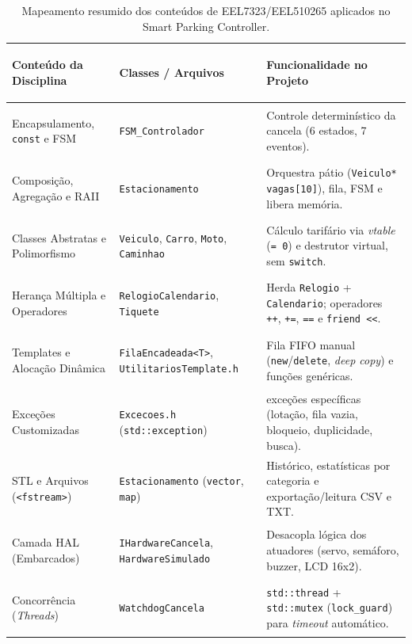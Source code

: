 \documentclass[10pt,twocolumn,a4paper]{article}
\newcommand{\code}[1]{\texttt{\footnotesize #1}}
\begin{document}
\begin{table}[t]
\centering
\caption{Mapeamento resumido dos conteúdos de EEL7323/EEL510265 aplicados no Smart Parking Controller.}
\label{tab:rastreabilidade}
\renewcommand{\arraystretch}{1.28}
\setlength{\tabcolsep}{6pt}
\footnotesize
{}
\begin{tabularx}{\textwidth}{
    >{\bfseries\raggedright\arraybackslash}p{4.1cm}
    >{\raggedright\arraybackslash}p{4.3cm}
    >{\raggedright\arraybackslash}X}
\toprule
\rowcolor{ufscBlue}
\color{white}Conteúdo da Disciplina &
\color{white}\textbf{Classes / Arquivos} &
\color{white}\textbf{Funcionalidade no Projeto} \\
\midrule
Encapsulamento, \code{const} e FSM & \code{FSM\_Controlador} & Controle determinístico da cancela (6 estados, 7 eventos). \\
Composição, Agregação e RAII & \code{Estacionamento} & Orquestra pátio (\code{Veiculo* vagas[10]}), fila, FSM e libera memória. \\
Classes Abstratas e Polimorfismo & \code{Veiculo}, \code{Carro}, \code{Moto}, \code{Caminhao} & Cálculo tarifário via \textit{vtable} (\code{= 0}) e destrutor virtual, sem \code{switch}. \\
Herança Múltipla e Operadores & \code{RelogioCalendario}, \code{Tiquete} & Herda \code{Relogio} + \code{Calendario}; operadores \code{++}, \code{+=}, \code{==} e \code{friend <{}<}. \\
Templates e Alocação Dinâmica & \code{FilaEncadeada<T>}, \code{UtilitariosTemplate.h} & Fila FIFO manual (\code{new}/\code{delete}, \textit{deep copy}) e funções genéricas. \\
Exceções Customizadas & \code{Excecoes.h} (\code{std::exception}) & 5 exceções específicas (lotação, fila vazia, bloqueio, duplicidade, busca). \\
STL e Arquivos (\code{<fstream>}) & \code{Estacionamento} (\code{vector}, \code{map}) & Histórico, estatísticas por categoria e exportação/leitura CSV e TXT. \\
Camada HAL (Embarcados) & \code{IHardwareCancela}, \code{HardwareSimulado} & Desacopla lógica dos atuadores (servo, semáforo, buzzer, LCD 16x2). \\
Concorrência (\textit{Threads}) & \code{WatchdogCancela} & \code{std::thread} + \code{std::mutex} (\code{lock\_guard}) para \textit{timeout} automático. \\
\bottomrule
\end{tabularx}
\end{table}
\end{document}
